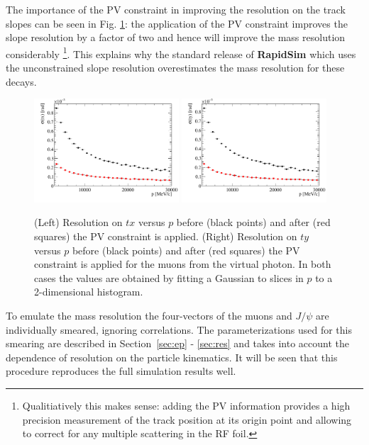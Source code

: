 The importance of the PV constraint in improving the resolution on the
track slopes can be seen in Fig. \ref{fig:sloperes}:  the application of the PV constraint improves the slope
resolution by a factor of two and
hence will improve the mass resolution considerably \footnote{Qualitiatively this
  makes sense: adding the PV information provides a high precision
  measurement of the track position at its origin point and allowing
  to correct for any multiple scattering in the RF foil.}. This explains why the standard
release of  \textbf{RapidSim} which uses the unconstrained slope resolution
overestimates the mass resolution for these decays.
\begin{figure}[h!]
\centering
\includegraphics[width=0.48\textwidth]{figs/txres.pdf}
\includegraphics[width=0.48\textwidth]{figs/tyres.pdf}
\caption{(Left) Resolution on $tx$ versus $p$ before (black points) and after (red
  squares) the PV constraint is applied. (Right) Resolution on $ty$
  versus $p$ before (black points) and after (red
  squares) the PV constraint is applied for the muons from the virtual
  photon. In both cases the values are
  obtained by fitting a Gaussian to slices in $p$ to a 2-dimensional histogram.
   }
\label{fig:sloperes}
\end{figure}

To emulate the mass resolution the four-vectors of the muons and
$J/\psi$ are individually smeared, ignoring correlations. The parameterizations used for this
smearing are described in Section~\ref{sec:ep} - \ref{sec:res} and
takes into account the dependence of resolution on the particle kinematics. It will be
seen that this procedure reproduces the full simulation results well.